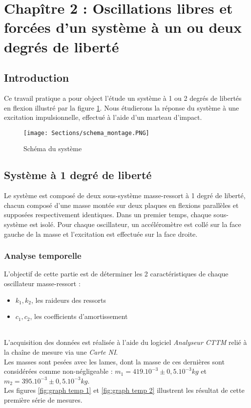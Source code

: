 

\section{Chapître 2 : Oscillations libres et forcées d'un système à un ou deux degrés de liberté}

\subsection{Introduction}
Ce travail pratique a pour object l'étude un système à 1 ou 2 degrés de libertés en flexion illustré par la figure \ref{fig:montage}. Nous étudierons la réponse du système à une excitation impulsionnelle, effectué à l'aide d'un marteau d'impact.

\begin{figure}
    \centering
    \texttt{[image: Sections/schema\_montage.PNG]}
    \caption{Schéma du système}
    \label{fig:montage}
\end{figure}


\subsection{Système à 1 degré de liberté}

Le système est composé de deux sous-système masse-ressort à 1 degré de liberté, chacun composé d'une masse montée sur deux plaques en flexions parallèles et supposées respectivement identiques. Dans un premier temps, chaque sous-système est isolé. Pour chaque oscillateur, un accéléromètre est collé sur la face gauche de la masse et l'excitation est effectuée sur la face droite. 

\subsubsection{Analyse temporelle}

L'objectif de cette partie est de déterminer les 2 caractéristiques de chaque oscillateur masse-ressort : \begin{itemize}
    \item $k_1,k_2$, les raideurs des ressorts
    \item $c_1,c_2$, les coefficients d'amortissement
\end{itemize}
\\
L'acquisition des données est réalisée à l'aide du logiciel \textit{Analyseur CTTM} relié à la chaîne de mesure via une \textit{Carte NI}.
\\
Les masses sont pesées avec les lames, dont la masse de ces dernières sont considérées comme non-négligeable : $m_1=419.10^{-3}\pm0,5.10^{-3}kg$ et $m_2=395.10^{-3}\pm0,5.10^{-3}kg$.
\\
Les figures \ref{fig:graph temp 1} et \ref{fig:graph temp 2} illustrent les résultat de cette première série de mesures.

